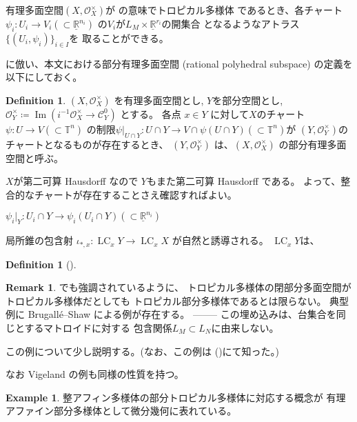 \documentclass[a4paper,dvipdfmx,reqno,12pt]{amsart}
\theoremstyle{definition}
\newtheorem{definition}[theorem]{Definition}
\newtheorem{example}[theorem]{Example}
\newtheorem{remark}[theorem]{Remark}
\newcommand{\deq}{\coloneqq}
\newcommand{\opn}[1]{\operatorname{#1}}
\numberwithin{equation}{section}
\begin{document}
有理多面空間$(X,\mathcal{O}_X^{\times})$が
\cite[Definition 6.1]{gross2019sheaftheoretic}の意味でトロピカル多様体
であるとき、各チャート
$\psi_i\colon U_i\to V_i(\subset \underline{\mathbb{R}}^{n_i})$
の$V_i$が$L_M\times \underline{\mathbb{R}}^{r_i}$の開集合
となるようなアトラス$\{(U_i,\psi_i)\}_{i\in I}$を
取ることができる。

\cite[Definition 2.14]{demedrano2023chern}
に倣い、本文における部分有理多面空間
(rational polyhedral subspace)
の定義を以下にしておく。


\begin{definition}

$(X,\mathcal{O}_X^{\times})$ を有理多面空間とし,
$Y$を部分空間とし, 
$\mathcal{O}^{\times}_{Y}\deq 
\opn{Im}(i^{-1}\mathcal{O}_X^{\times}\to \mathcal{C}_{Y}^{0})$
とする。
各点 $x\in Y$ に対して$X$のチャート
$\psi\colon U\to V(\subset \mathbb{T}^{n})$
の制限$\psi|_{U\cap Y}\colon U\cap Y\to 
V\cap \psi(U\cap Y)(\subset \mathbb{T}^{n})$が
$(Y,\mathcal{O}_Y^{\times})$のチャートとなるものが存在するとき、
$(Y,\mathcal{O}_Y^{\times})$
は、$(X,\mathcal{O}^{\times}_X)$
の部分有理多面空間と呼ぶ。
\end{definition}

$X$が第二可算 Hausdorff なので
$Y$もまた第二可算 Hausdorff である。
よって、整合的なチャートが存在することさえ確認すればよい。

$\psi_i|_{Y}\colon U_i\cap Y \to \psi_i(U_i\cap Y)(\subset 
\underline{\mathbb{R}}^{n_i})$

局所錐の包含射
$\iota_{*,x}\colon \opn{LC}_x Y\to \opn{LC}_x X$
が自然と誘導される。
$\opn{LC}_x Y$は、

\begin{definition}[{\cite[Definition 2.14]{demedrano2023chern}}]
     
\end{definition}

\begin{remark}
\cite[Example 2.15]{demedrano2023chern}でも強調されているように、
トロピカル多様体の閉部分多面空間がトロピカル多様体だとしても
トロピカル部分多様体であるとは限らない。
典型例に Brugall\'e--Shaw による例が存在する。
--------
この埋め込みは、台集合を同じとするマトロイドに対する
包含関係$L_M\subset L_N$に由来しない。

この例について少し説明する。(なお、この例は
()にて知った。)

なお Vigeland の例も同様の性質を持つ。
\end{remark}

\begin{example}
整アフィン多様体の部分トロピカル多様体に対応する概念が
有理アファイン部分多様体として微分幾何に表れている。 
\end{example}
\end{document}
